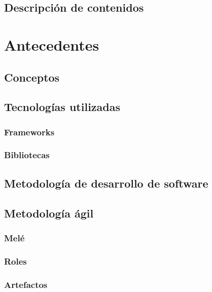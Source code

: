 \documentclass{iccmemoria}
\begin{document}
	\section{Descripción de contenidos}
	

\chapter{Antecedentes}
	\section{Conceptos}
		

	\section{Tecnologías utilizadas}
		
		\subsection{Frameworks}
		
		\subsection{Bibliotecas}
		

	\section{Metodología de desarrollo de software}
		

	\section{Metodología ágil}
		\subsection{Melé}
		
		\subsection{Roles}
		
		\subsection{Artefactos}
		
\end{document}
